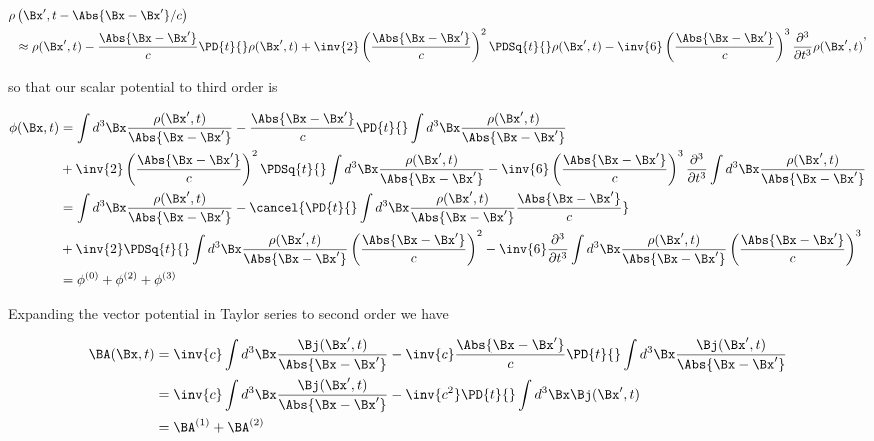 \begin{equation}\label{eqn:relativisticElectrodynamicsL27:30}
\begin{aligned}
\rho&\left(\Bx', t - \Abs{\Bx - \Bx'}/c\right) \\
&\approx 
\rho(\Bx', t) 
- \frac{\Abs{\Bx - \Bx'}}{c} \PD{t}{} \rho(\Bx', t) 
+ \inv{2} \left(\frac{\Abs{\Bx - \Bx'}}{c}\right)^2 \PDSq{t}{} \rho(\Bx', t) 
- \inv{6} \left(\frac{\Abs{\Bx - \Bx'}}{c}\right)^3 \frac{\partial^3}{\partial t^3} \rho(\Bx', t) 
\end{aligned},
\end{equation}

so that our scalar potential to third order is

\begin{align*}
\phi(\Bx, t) 
&=
\int d^3 \Bx \frac{\rho(\Bx', t) }{\Abs{\Bx - \Bx'}}
- \frac{\Abs{\Bx - \Bx'}}{c} \PD{t}{} \int d^3 \Bx \frac{\rho(\Bx', t) }{\Abs{\Bx - \Bx'}} \\
&+ \inv{2} \left(\frac{\Abs{\Bx - \Bx'}}{c}\right)^2 \PDSq{t}{} \int d^3 \Bx \frac{\rho(\Bx', t) }{\Abs{\Bx - \Bx'}}
- \inv{6} \left(\frac{\Abs{\Bx - \Bx'}}{c}\right)^3 \frac{\partial^3}{\partial t^3} \int d^3 \Bx \frac{\rho(\Bx', t) }{\Abs{\Bx - \Bx'}} \\
&=
\int d^3 \Bx \frac{\rho(\Bx', t) }{\Abs{\Bx - \Bx'}}
- 
\cancel{\PD{t}{} \int d^3 \Bx \frac{\rho(\Bx', t) }{\Abs{\Bx - \Bx'}} 
\frac{\Abs{\Bx - \Bx'}}{c} }
\\
&+ \inv{2} 
\PDSq{t}{} \int d^3 \Bx \frac{\rho(\Bx', t) }{\Abs{\Bx - \Bx'}}
\left(\frac{\Abs{\Bx - \Bx'}}{c}\right)^2 
- \inv{6} 
\frac{\partial^3}{\partial t^3} \int d^3 \Bx \frac{\rho(\Bx', t) }{\Abs{\Bx - \Bx'}} 
\left(\frac{\Abs{\Bx - \Bx'}}{c}\right)^3  \\
&= \phi^{(0)} + \phi^{(2)} + \phi^{(3)}
\end{align*}

Expanding the vector potential in Taylor series to second order we have

\begin{align*}
\BA(\Bx, t) 
&=
\inv{c} \int d^3 \Bx \frac{\Bj(\Bx', t) }{\Abs{\Bx - \Bx'}}
- \inv{c} \frac{\Abs{\Bx - \Bx'}}{c} \PD{t}{} \int d^3 \Bx \frac{\Bj(\Bx', t) }{\Abs{\Bx - \Bx'}} \\
&=
\inv{c} \int d^3 \Bx \frac{\Bj(\Bx', t) }{\Abs{\Bx - \Bx'}}
- 
\inv{c^2} \PD{t}{} \int d^3 \Bx \Bj(\Bx', t) 
\\
&= \BA^{(1)} + \BA^{(2)} 
\end{align*}

